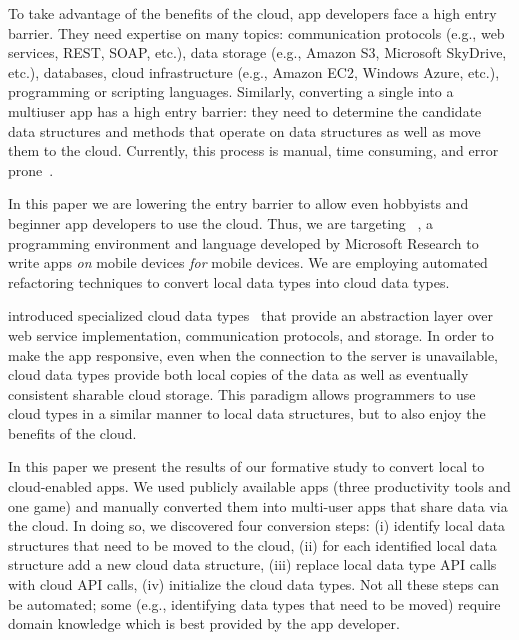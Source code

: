 \documentclass[article]{sigplanconf}
\begin{document}
To take advantage of the benefits of the cloud, app developers face a high entry barrier. They need expertise on many topics: communication protocols (e.g., web services, REST, SOAP, etc.), data storage (e.g., Amazon S3, Microsoft SkyDrive, etc.), databases, cloud infrastructure (e.g., Amazon EC2, Windows Azure, etc.),  programming or scripting languages. Similarly, converting a single into a multiuser app has a high entry barrier: they need to determine the candidate data structures and methods that operate on data structures as well as move them to the cloud. Currently, this process is manual, time consuming, and error prone~\cite{khan2013survey}.

In this paper we are lowering the entry barrier to allow even hobbyists and beginner app developers to use the cloud. Thus, we are targeting \TD~\cite{Tillmann2011TPC20482372048245}, a programming environment and language developed by Microsoft Research to write apps \emph{on} mobile devices \emph{for} mobile devices. We are employing automated refactoring techniques to convert local data types into cloud data types.

\TD introduced specialized cloud data types~\cite{burckhardt2012cloud} that provide an abstraction layer over web service implementation, communication protocols, and storage.  In order to make the app responsive, even when the connection to the server is unavailable, cloud data types provide both local copies of the data as well as eventually consistent sharable cloud storage. This paradigm allows programmers to use cloud types in a similar manner to local data structures, but to also enjoy the benefits of the cloud.

In this paper we present the results of our formative study to convert local to cloud-enabled apps. We used \numFormative publicly available \TD apps (three productivity tools and one game) and manually converted them into multi-user apps that share data via the cloud. In doing so, we discovered four conversion steps: (i) identify local data structures that need to be moved to the cloud, (ii) for each identified local data structure add a new cloud data structure, (iii) replace local data type API calls with cloud API calls, (iv) initialize the cloud data types. Not all these steps can be automated; some (e.g., identifying data types that need to be moved) require domain knowledge which is best provided by the app developer. 
\end{document}
